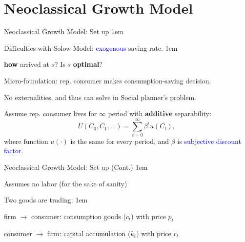 \documentclass[11pt,aspectratio=43,usenames,dvipsnames]{beamer}
\newcommand{\blue}[1]{\textcolor{blue}{#1}}
\let\olditemize=\itemize
\let\endolditemize=\enditemize
\renewenvironment{itemize}{\olditemize \itemsep1em}{\endolditemize}
\theoremstyle{definition}
\begin{document}
\section{Neoclassical Growth Model}
\label{sec:Neoclassical_Growth_Model}

\begin{frame}{Neoclassical Growth Model: Set up}
\label{slide:Optimal_Growth_Model}
    \begin{itemize}
        \item Difficulties with Solow Model: \blue{exogenous} saving rate.
        \begin{itemize}
            \item \textbf{how} arrived at $ s $? Is $ s $ \textbf{optimal}?
        \end{itemize}
        \item Micro-foundation: rep. consumer makes consumption-saving decision.
        \item No externalities, and thus can solve in Social planner's problem.
        \item Assume rep. consumer lives for $ \infty $ period with \textbf{additive} separability:
        \begin{equation}
        \label{eq:rep_consumer_u}
            U(C_{0}, C_{1}, \ldots) = \sum_{t=0}^{\infty} \beta^{t} u(C_{t})
        ,\end{equation}
        where function $ u(\cdot) $ is the same for every period, and $ \beta $ is \blue{subjective discount factor}.
    \end{itemize}
\end{frame}

\begin{frame}{Neoclassical Growth Model: Set up (Cont.)}
\label{slide:Neoclassical_Growth_Model__Set_up__Cont__}
    \begin{itemize}
        \item Assumes no labor (for the sake of sanity)
        \item Two goods are trading:
        \begin{itemize}
            \item firm $ \rightarrow  $ consumer: consumption goods ($c_{t}$) with price $ p_{t} $
            \item consumer $ \rightarrow  $ firm: capital accumulation ($k_{t}$) with price $ r_{t} $
        \end{itemize}

    \end{itemize}

\end{frame}
\end{document}
